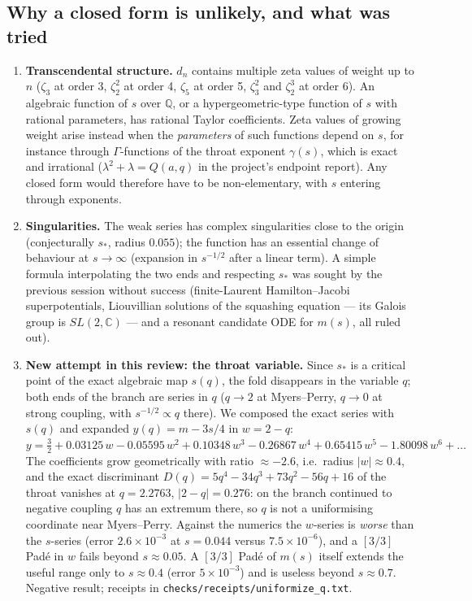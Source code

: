 \subsection*{Why a closed form is unlikely, and what was tried}

\begin{enumerate}
\item \textbf{Transcendental structure.} $d_n$ contains multiple zeta values of weight up to $n$
 ($\zeta_3$ at order 3, $\zeta_2^2$ at order 4, $\zeta_5$ at order 5, $\zeta_3^2$ and
 $\zeta_2^3$ at order 6). An algebraic function of $s$ over $\mathbb Q$, or a hypergeometric-type
 function of $s$ with rational parameters, has rational Taylor coefficients. Zeta values of
 growing weight arise instead when the \emph{parameters} of such functions depend on $s$,
 for instance through $\Gamma$-functions of the throat exponent $\gamma(s)$, which is exact
 and irrational ($\lambda^2+\lambda=Q(a,q)$ in the project's endpoint report). Any closed form
 would therefore have to be non-elementary, with $s$ entering through exponents.
\item \textbf{Singularities.} The weak series has complex singularities close to the origin
 (conjecturally $s_*$, radius $0.055$); the function has an essential change of behaviour at
 $s\to\infty$ (expansion in $s^{-1/2}$ after a linear term). A simple formula interpolating the
 two ends and respecting $s_*$ was sought by the previous session without success
 (finite-Laurent Hamilton--Jacobi superpotentials, Liouvillian solutions of the squashing
 equation --- its Galois group is $SL(2,\mathbb C)$ --- and a resonant candidate ODE for $m(s)$,
 all ruled out).
\item \textbf{New attempt in this review: the throat variable.} Since $s_*$ is a critical
 point of the exact algebraic map $s(q)$, the fold disappears in the variable $q$; both ends of
 the branch are series in $q$ ($q\to2$ at Myers--Perry, $q\to0$ at strong coupling, with
 $s^{-1/2}\propto q$ there). We composed the exact series with $s(q)$ and expanded
 $y(q)=m-3s/4$ in $w=2-q$:
 $y=\tfrac32+0.03125\,w-0.05595\,w^2+0.10348\,w^3-0.26867\,w^4+0.65415\,w^5-1.80098\,w^6+\dots$
 The coefficients grow geometrically with ratio $\approx-2.6$, i.e.\ radius $|w|\approx0.4$, and
 the exact discriminant $D(q)=5q^4-34q^3+73q^2-56q+16$ of the throat vanishes at $q=2.2763$,
 $|2-q|=0.276$: on the branch continued to negative coupling $q$ has an extremum there, so $q$
 is not a uniformising coordinate near Myers--Perry. Against the numerics the $w$-series is
 \emph{worse} than the $s$-series (error $2.6\times10^{-3}$ at $s=0.044$ versus
 $7.5\times10^{-6}$), and a $[3/3]$ Pad\'e in $w$ fails beyond $s\approx0.05$. A $[3/3]$ Pad\'e
 of $m(s)$ itself extends the useful range only to $s\approx0.4$ (error $5\times10^{-3}$) and
 is useless beyond $s\approx0.7$. Negative result; receipts in
 \texttt{checks/receipts/uniformize\_q.txt}.
\end{enumerate}

